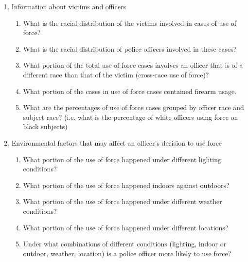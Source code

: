 \documentclass[10pt]{article}
\begin{document}
\begin{enumerate}

\item Information about victims and officers

    \begin{enumerate}

    \item What is the racial distribution of the victims involved in cases of use of force?

    \item What is the racial distribution of police officers involved in these cases?

    \item What portion of the total use of force cases involves an officer that is of a different race than that of the victim (cross-race use of force)?

    \item What portion of the cases in use of force cases contained firearm usage.

    \item What are the percentages of use of force cases grouped by officer race and subject race? (i.e. what is the percentage of white officers using force on black subjects)

    \end{enumerate}

\item Environmental factors that may affect an officer's decision to use force

    \begin{enumerate}

    \item What portion of the use of force happened under different lighting conditions?

    \item What portion of the use of force happened indoors against outdoors?

    \item What portion of the use of force happened under different weather conditions?

    \item What portion of the use of force happened under different locations?

    \item Under what combinations of different conditions (lighting, indoor or outdoor, weather, location) is a police officer more likely to use force?

    \end{enumerate}


\end{enumerate}
\end{document}
